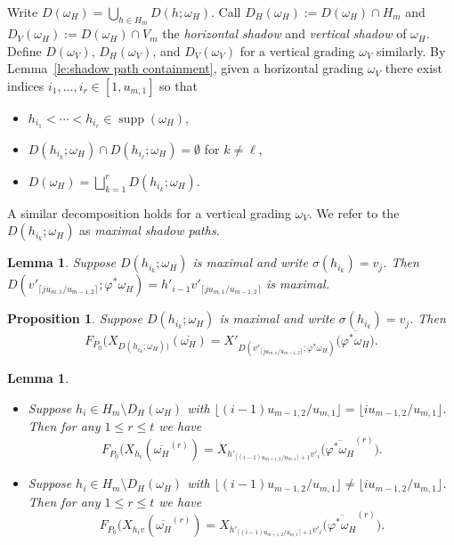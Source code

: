\documentclass{amsart}
\newtheorem{lemma}[theorem]{Lemma}
\newtheorem{proposition}[theorem]{Proposition}
\newcommand{\supp}{\operatorname{supp}}
\begin{document}
Write $D(\omega_H)=\bigcup\limits_{h\in H_m} D(h;\omega_H)$.  Call $D_H(\omega_H):=D(\omega_H)\cap H_m$ and $D_V(\omega_H):=D(\omega_H)\cap V_m$ the \emph{horizontal shadow} and \emph{vertical shadow} of $\omega_H$.  Define $D(\omega_V)$, $D_H(\omega_V)$, and $D_V(\omega_V)$ for a vertical grading $\omega_V$ similarly.  By Lemma~\ref{le:shadow path containment}, given a horizontal grading $\omega_V$ there exist indices $i_1,\ldots,i_r\in[1,u_{m,1}]$ so that 
\begin{itemize}
  \item $h_{i_1}<\cdots<h_{i_r}\in\supp(\omega_H)$,
  \item $D(h_{i_k};\omega_H)\cap D(h_{i_\ell};\omega_H)=\emptyset$ for $k\ne\ell$,
  \item $D(\omega_H)=\bigsqcup\limits_{k=1}^r D(h_{i_k};\omega_H)$.
\end{itemize}
A similar decomposition holds for a vertical grading $\omega_V$.  We refer to the $D(h_{i_k};\omega_H)$ as \emph{maximal shadow paths}.
\begin{lemma}
  Suppose $D(h_{i_k};\omega_H)$ is maximal and write $\sigma(h_{i_k})=v_j$.  Then $D(v'_{\lceil ju_{m,1}/u_{m-1,2}\rceil};\varphi^*\omega_H)=h'_{i-1}v'_{\lceil ju_{m,1}/u_{m-1,2}\rceil}$ is maximal.
\end{lemma}

\begin{proposition}
  Suppose $D(h_{i_k};\omega_H)$ is maximal and write $\sigma(h_{i_k})=v_j$.  Then 
  \[F_{P_0}\big(X_{D(h_{i_k};\omega_H)\big)}(\overline{\omega_H})=X'_{D(v'_{\lceil ju_{m,1}/u_{m-1,2}\rceil};\varphi^*\omega_H)}\big(\overline{\varphi^*\omega_H}\big).\]
\end{proposition}

\begin{lemma}\mbox{}
  \begin{itemize}
    \item Suppose $h_i\in H_m\setminus D_H(\omega_H)$ with $\lfloor (i-1)u_{m-1,2}/u_{m,1}\rfloor=\lfloor iu_{m-1,2}/u_{m,1}\rfloor$.  Then for any $1\le r\le t$ we have
    \[F_{P_0}(X_{h_i}(\overline{\omega_H}^{(r)})=X_{h'_{\lceil(i-1)u_{m+1,2}/u_{m,1}\rceil+1}v'_i}\big(\overline{\varphi^*\omega_H}^{(r)}\big).\] 
    \item Suppose $h_i\in H_m\setminus D_H(\omega_H)$ with $\lfloor (i-1)u_{m-1,2}/u_{m,1}\rfloor\ne\lfloor iu_{m-1,2}/u_{m,1}\rfloor$.  Then for any $1\le r\le t$ we have
    \[F_{P_0}(X_{h_iv}(\overline{\omega_H}^{(r)})=X_{h'_{\lceil(i-1)u_{m+1,2}/u_{m,1}\rceil+1}v'_i}\big(\overline{\varphi^*\omega_H}^{(r)}\big).\]
  \end{itemize}
\end{lemma}
\end{document}

